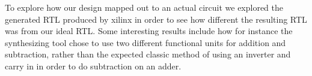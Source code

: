 To explore how our design mapped out to an actual circuit we explored the generated RTL produced by xilinx in order to see how different the resulting RTL was from our ideal RTL.
Some interesting results include how for instance the synthesizing tool chose to use two different functional units for addition and subtraction, rather than the expected classic method of using an inverter and carry in in order to do subtraction on an adder.

